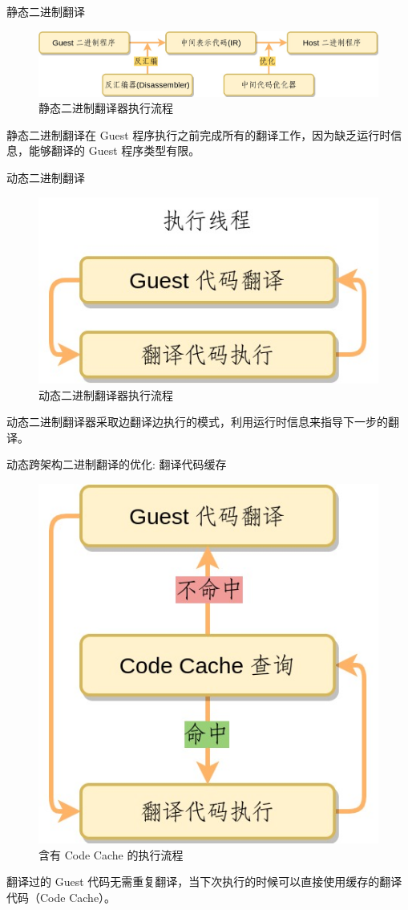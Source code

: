 \documentclass{beamer}
\begin{document}
\begin{frame}{静态二进制翻译}
	\begin{figure}
		\includegraphics[width=1\linewidth]{../paper/images/static-bt.jpg}
		\caption{静态二进制翻译器执行流程}
	\end{figure}
	静态二进制翻译在 Guest 程序执行之前完成所有的翻译工作，因为缺乏运行时信息，能够翻译的 Guest 程序类型有限。
\end{frame}

\begin{frame}{动态二进制翻译}
	\begin{figure}
		\includegraphics[width=0.4\linewidth]{../paper/images/basic-flow2.jpg}
		\caption{动态二进制翻译器执行流程}
	\end{figure}
	动态二进制翻译器采取边翻译边执行的模式，利用运行时信息来指导下一步的翻译。
\end{frame}

\begin{frame}{动态跨架构二进制翻译的优化: 翻译代码缓存}
	\begin{figure}
		\includegraphics[width=0.3\linewidth]{../paper/images/basic-flow3.jpg}
		\caption{含有 Code Cache 的执行流程}
	\end{figure}
	翻译过的 Guest 代码无需重复翻译，当下次执行的时候可以直接使用缓存的翻译代码（Code Cache）。
\end{frame}
\end{document}
